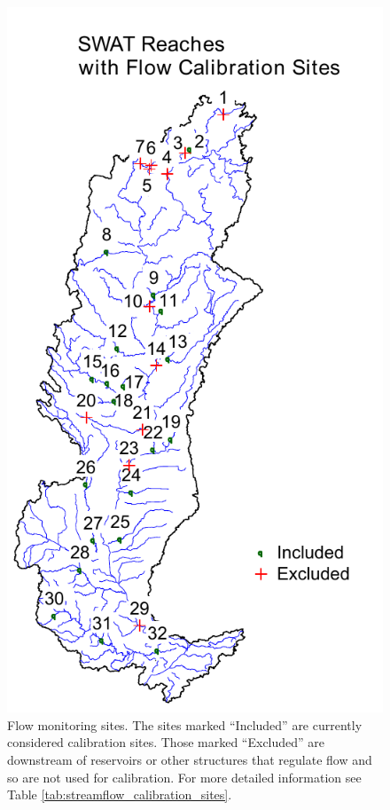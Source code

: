 \begin{figure}[h]
	\centering
	\includegraphics{./img/flow_calib_sites_changed}
	\caption{Flow monitoring sites. The sites marked ``Included'' are currently considered calibration sites. Those marked ``Excluded'' are downstream of reservoirs or other structures that regulate flow and so are not used for calibration. For more detailed information see Table \ref{tab:streamflow_calibration_sites}.}
	\label{fig:calibration_site_map}
\end{figure}
\clearpage